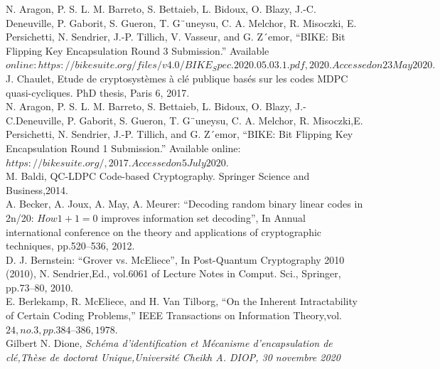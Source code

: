 \documentclass[12pt,openany]{report}
\begin{document}
\begin{thebibliography}{1}
 N. Aragon, P. S. L. M. Barreto, S. Bettaieb, L. Bidoux, O. Blazy, J.-C.
Deneuville, P. Gaborit, S. Gueron, T. G¨uneysu, C. A. Melchor, R. Misoczki,
E. Persichetti, N. Sendrier, J.-P. Tillich, V. Vasseur, and G. Z´emor, “BIKE:
Bit Flipping Key Encapsulation Round 3 Submission.” Available $online: https:
//bikesuite.org/files/v4.0/BIKE_Spec.2020.05.03.1.pdf, 2020. Accessed
on 23 May 2020.$ \\

 J. Chaulet, Etude de cryptosystèmes à clé publique basés sur les codes MDPC quasi-cycliques. PhD thesis, Paris 6, 2017.\\

N. Aragon, P. S. L. M. Barreto, S. Bettaieb, L. Bidoux, O. Blazy, J.-C.Deneuville, P. Gaborit, S. Gueron, T. G¨uneysu, C. A. Melchor, R. Misoczki,E. Persichetti, N. Sendrier, J.-P. Tillich, and G. Z´emor, “BIKE: Bit Flipping Key Encapsulation Round 1 Submission.” Available online:$ https://bikesuite.org/, 2017. Accessed on 5 July 2020.$\\


 M. Baldi, QC-LDPC Code-based Cryptography. Springer Science and Business,2014.\\



 A. Becker, A. Joux, A. May, A. Meurer: “Decoding random binary linear codes in 2n/20: $How 1 + 1 = 0$ improves information set decoding”, In Annual international conference on the theory and applications of cryptographic techniques, pp.520–536, 2012.\\




 D. J. Bernstein: “Grover vs. McEliece”, In Post-Quantum Cryptography 2010 (2010),
N. Sendrier,Ed., vol.6061 of Lecture Notes in Comput. Sci., Springer, pp.73–80, 2010.\\

 E. Berlekamp, R. McEliece, and H. Van Tilborg, “On the Inherent Intractability of Certain Coding Problems,” IEEE Transactions on Information Theory,vol. $24, no. 3, pp. 384–386, 1978.$\\

 Gilbert N. Dione, \it{Schéma d'identification et Mécanisme d'encapsulation de clé},Thèse de doctorat Unique,Université Cheikh A. DIOP, 30 novembre 2020 \\


\end{thebibliography}
\end{document}
